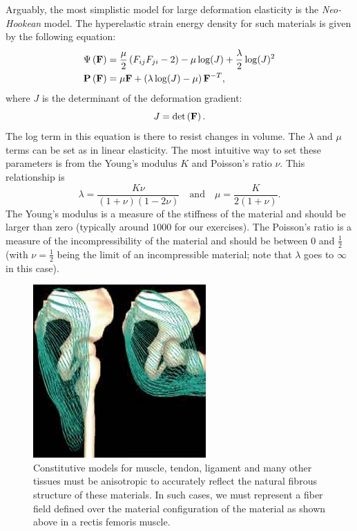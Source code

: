 Arguably, the most simplistic model for large deformation elasticity is the \emph{Neo-Hookean} model. The hyperelastic strain energy density for such materials is given by the following equation:
\begin{align*}
\Psi \left( \mathbf{F} \right) & = \frac{\mu}{2} \left( F_{ij} F_{ji} - 2 \right) - \mu \log(J) + \frac{\lambda}{2} \log(J)^2 \\
\mathbf{P} \left( \mathbf{F} \right) & = \mu \mathbf{F} + \left( \lambda \log(J) - \mu \right) \mathbf{F}^{-T},
\end{align*}
where  $J$ is the determinant of the deformation gradient:
\begin{equation*}
J = \det \left( \mathbf{F} \right).
\end{equation*}
The log term in this equation is there to resist changes in volume. The $\lambda$ and $\mu$ terms can be set as in linear elasticity. The most intuitive way to set these parameters is from the Young's modulus $K$ and Poisson's ratio $\nu$. This relationship is
\begin{equation*}
\lambda = \frac{K \nu}{(1 + \nu)(1 - 2\nu)} \quad \text{and} \quad \mu = \frac{K}{2 (1 + \nu)}.
\end{equation*}
The Young's modulus is a measure of the stiffness of the material and should be larger than zero (typically around $1000$ for our exercises). The Poisson's ratio is a measure of the incompressibility of the material and should be between 0 and $\frac{1}{2}$ (with $\nu = \frac{1}{2}$ being the limit of an incompressible material; note that $\lambda$ goes to $\infty$ in this case).

\begin{figure}
\includegraphics[width=.5\textwidth]{images/muscle_biomechanics_2005}
\caption{Constitutive models for muscle, tendon, ligament and many other tissues must be anisotropic to accurately reflect the natural fibrous structure of these materials. In such cases, we must represent a fiber field defined over the material configuration of the material as shown above in a rectis femoris muscle.}
\label{fig:fibers}
\end{figure}

